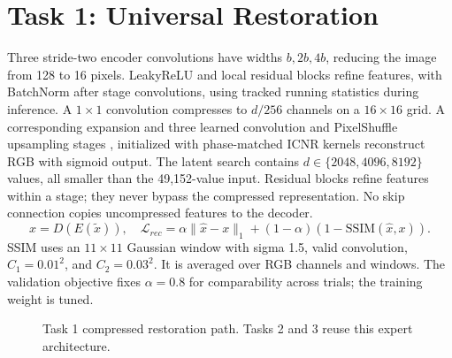 \documentclass[conference]{IEEEtran}
\begin{document}
\section{Task 1: Universal Restoration}
Three stride-two encoder convolutions have widths $b,2b,4b$, reducing the image from 128 to 16 pixels. LeakyReLU and local residual blocks refine features, with BatchNorm after stage convolutions, using tracked running statistics during inference. A $1\times1$ convolution compresses to $d/256$ channels on a $16\times16$ grid. A corresponding expansion and three learned convolution and PixelShuffle upsampling stages \cite{shi}, initialized with phase-matched ICNR kernels \cite{aitken} reconstruct RGB with sigmoid output. The latent search contains $d\in\{2048,4096,8192\}$ values, all smaller than the 49,152-value input. Residual blocks refine features within a stage; they never bypass the compressed representation. 
No skip connection copies uncompressed features to the decoder.
\begin{equation}
\hat{x}=D(E(\tilde{x})),\quad
\mathcal{L}_{rec}=\alpha\|\hat{x}-x\|_1+(1-\alpha)(1-\mathrm{SSIM}(\hat{x},x)).
\end{equation}
SSIM uses an $11\times11$ Gaussian window with sigma 1.5, valid convolution,
$C_1=0.01^2$, and $C_2=0.03^2$. It is averaged over RGB channels and windows.
The validation objective fixes $\alpha=0.8$ for comparability across trials;
the training weight is tuned.
\begin{figure}[!ht]\centering
{}\caption{Task 1 compressed restoration path. Tasks 2 and 3 reuse this expert architecture.}\end{figure}
\end{document}

